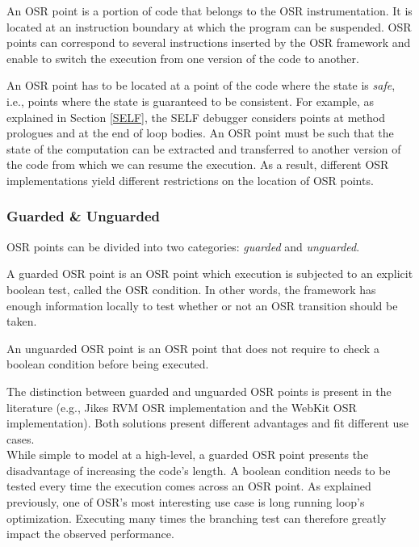 \begin{definition}\label{OSRPointDefinition}
An OSR point is a portion of code that belongs to the OSR instrumentation.
It is located at an instruction boundary at which the program can be suspended.
OSR points can correspond to several instructions inserted by the OSR framework and enable to switch the execution from one version of the code to another.
\end{definition}

An OSR point has to be located at a point of the code where the state is \textit{safe}, i.e., points where the state is guaranteed to be consistent.
For example, as explained in Section \ref{SELF}, the SELF debugger\cite{holzle1992debugging} considers points at method prologues and at the end of loop bodies.
An OSR point must be such that the state of the computation can be extracted and transferred to another version of the code from which we can resume the execution.
As a result, different OSR implementations yield different restrictions on the location of OSR points.\\

\subsubsection{Guarded \& Unguarded}

OSR points can be divided into two categories: \textit{guarded} and \textit{unguarded}.
\begin{definition}
A guarded OSR point is an OSR point which execution is subjected to an explicit boolean test, called the OSR condition.
In other words, the framework has enough information locally to test whether or not an OSR transition should be taken.
\end{definition}
\begin{definition}
An unguarded OSR point is an OSR point that does not require to check a boolean condition before being executed. 
\end{definition}
The distinction between guarded and unguarded OSR points is present in the literature (e.g., Jikes RVM OSR implementation\cite{fink2003design, soman2006efficient} and the WebKit OSR implementation\cite{WebKitURL}).
Both solutions present different advantages and fit different use cases.\\

While simple to model at a high-level, a guarded OSR point presents the disadvantage of increasing the code's length. 
A boolean condition needs to be tested every time the execution comes across an OSR point.
As explained previously, one of OSR's most interesting use case is long running loop's optimization.
Executing many times the branching test can therefore greatly impact the observed performance.\\

